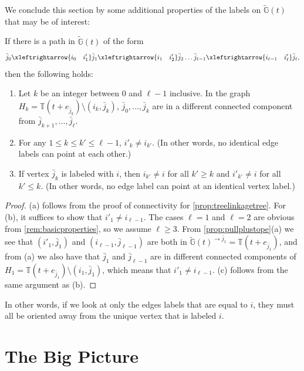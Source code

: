 \documentclass[letterpaper,reqno,11pt]{amsart}
\begin{document}
We conclude this section by some additional properties of the labels on $\tilde{\mathbb{G}}(t)$ that may be of interest:

\begin{proposition}
    If there is a path in $\tilde{\mathbb{G}}(t)$ of the form \[\bar{j}_0 \xleftrightarrow{i_0\quad i'_1}\bar{j}_1 \xleftrightarrow{i_1\quad i'_2}\bar{j}_2 \dots \bar{j}_{\ell-1} \xleftrightarrow{i_{\ell-1}\quad i'_\ell}\bar{j}_\ell,\] then the following holds: \begin{enumerate}
        \item[(a)] Let $k$ be an integer between $0$ and $\ell-1$ inclusive. In the graph $H_k = \mathbb{T}(t+e_{\bar{j}_k})\setminus (i_k, \bar{j}_k)$, $\bar{j}_0, \dots, \bar{j}_k$ are in a different connected component from $\bar{j}_{k+1}, \dots, \bar{j}_{\ell}$.
        \item[(b)] For any $1\leq k\leq k'\leq \ell - 1$, $i'_{k}\neq i_{k'}$. (In other words, no identical edge labels can point at each other.)
        \item[(c)] If vertex $\bar{j}_k$ is labeled with $i$, then $i_{k'}\neq i$ for all $k' \geq k$ and $i'_{k'}\neq i$ for all $k' \leq k$. (In other words, no edge label can point at an identical vertex label.)
    \end{enumerate}
\end{proposition}

\begin{proof}
    (a) follows from the proof of connectivity for \cref{prop:treelinkagetree}. For (b), it suffices to show that $i'_1\neq i_{\ell - 1}$. The cases $\ell = 1$ and $\ell = 2$ are obvious from \cref{rem:basicproperties}, so we assume $\ell \geq 3$. From \cref{prop:pullplustope}(a) we see that $(i'_1, \bar{j}_1)$ and $(i_{\ell-1}, \bar{j}_{\ell-1})$ are both in $\tilde{\mathbb{G}}(t)^{\rightarrow \bar{j}_1} = \mathbb{T}(t+e_{\bar{j}_1})$, and from (a) we also have that $\bar{j}_1$ and $\bar{j}_{\ell-1}$ are in different connected components of $H_1 = \mathbb{T}(t+e_{\bar{j}_1})\setminus (i_1, \bar{j}_1)$, which means that $i'_1\neq i_{\ell-1}$. (c) follows from the same argument as (b).
\end{proof}

In other words, if we look at only the edges labels that are equal to $i$, they must all be oriented away from the unique vertex that is labeled $i$.

\section{The Big Picture}\label{sec:bigpicture}
\end{document}
